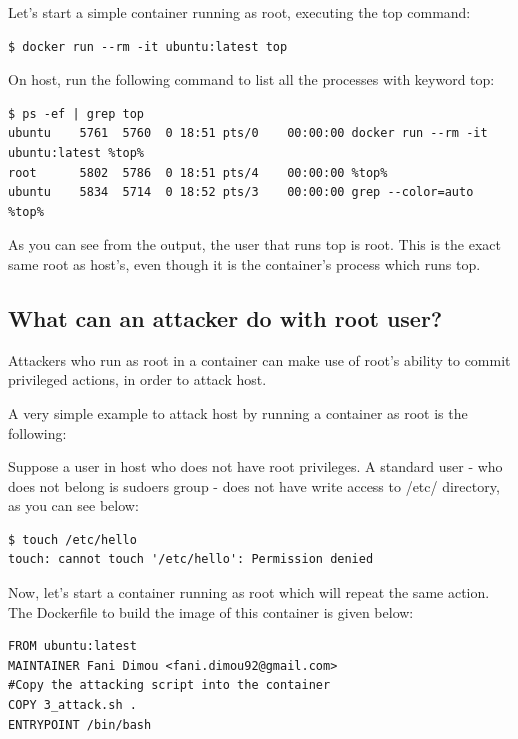 Let's start a simple container running as root, executing the top command:

\begin{lstlisting}[style=dockercommands]
$ docker run --rm -it ubuntu:latest top
\end{lstlisting}

On host, run the following command to list all the processes with keyword top:
\begin{lstlisting}[style=terminal, basicstyle={\fontsize{10}{11}\color{black}\ttfamily}]
$ ps -ef | grep top
ubuntu    5761  5760  0 18:51 pts/0    00:00:00 docker run --rm -it ubuntu:latest %top%
root      5802  5786  0 18:51 pts/4    00:00:00 %top%
ubuntu    5834  5714  0 18:52 pts/3    00:00:00 grep --color=auto %top%
\end{lstlisting}

As you can see from the output, the user that runs top is root. This is the exact same root as host's, even though it is the container's process which runs top.

\subsection{What can an attacker do with root user?} \label{rootuseracctions}
Attackers who run as root in a container can make use of root's ability to commit privileged actions, in order to attack host. 

A very simple example to attack host by running a container as root is the following: 

Suppose a user in host who does not have root privileges. A standard user - who does not belong is sudoers group - does not have write access to /etc/ directory, as you can see below:

\begin{lstlisting}[style=terminal]
$ touch /etc/hello
touch: cannot touch '/etc/hello': Permission denied
\end{lstlisting}

Now, let's start a container running as root which will repeat the same action. The Dockerfile to build the image of this container is given below:

\begin{lstlisting}[style=Dockerfile, caption={Dockerfile used for root\_attack image}]
FROM ubuntu:latest
MAINTAINER Fani Dimou <fani.dimou92@gmail.com>
#Copy the attacking script into the container
COPY 3_attack.sh .
ENTRYPOINT /bin/bash
\end{lstlisting}


